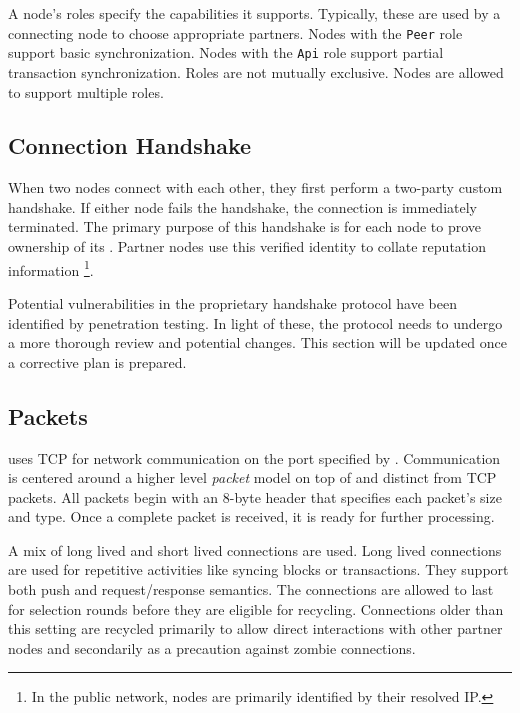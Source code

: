 A node's roles specify the capabilities it supports.
Typically, these are used by a connecting node to choose appropriate partners.
Nodes with the \texttt{Peer} role support basic synchronization.
Nodes with the \texttt{Api} role support partial transaction synchronization.
Roles are not mutually exclusive.
Nodes are allowed to support multiple roles.

\subsection{Connection Handshake}

When two \codenamespace nodes connect with each other, they first perform a two-party custom handshake.
If either node fails the handshake, the connection is immediately terminated.
The primary purpose of this handshake is for each node to prove ownership of its .
Partner nodes use this verified identity to collate reputation  information
\footnote{In the public network, nodes are primarily identified by their resolved IP.}.

Potential vulnerabilities in the \codenamespace proprietary handshake protocol have been identified by penetration testing.
In light of these, the protocol needs to undergo a more thorough review and potential changes.
This section will be updated once a corrective plan is prepared.

\subsection{Packets}

\codenamespace uses TCP for network communication on the port specified by .
Communication is centered around a higher level \emph{packet} model on top of and distinct from TCP packets.
All packets begin with an 8-byte header that specifies each packet's size and type.
Once a complete packet is received, it is ready for further processing.

\begin{figure}[H]
\end{figure}

A mix of long lived and short lived connections are used.
Long lived connections are used for repetitive activities like syncing blocks or transactions.
They support both push and request/response semantics.
The connections are allowed to last for  selection rounds  before they are eligible for recycling.
Connections older than this setting are recycled primarily to allow direct interactions with other partner nodes and secondarily as a precaution against zombie connections.

